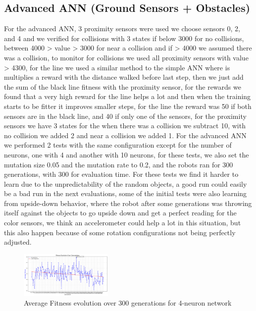\documentclass[final,5p,times,twocolumn,authoryear]{elsarticle}
\begin{document}
\subsection{Advanced ANN (Ground Sensors + Obstacles)}
For the advanced ANN, 3 proximity sensors were used we choose sensors 0, 2, and 4 and we verified for collisions with 3 states if below 3000 for no collisions, between 4000 > value > 3000 for near a collision and if > 4000 we assumed there was a collision, to monitor for collisions we used all proximity sensors with value > 4300, for the line we used a similar method to the simple ANN where is multiplies a reward with the distance walked before last step, then we just add the sum of the black line fitness with the proximity sensor, for the rewards we found that a very high reward for the line helps a lot and then when the training starts to be fitter it improves smaller steps, for the line the reward was 50 if both sensors are in the black line, and 40 if only one of the sensors, for the proximity sensors we have 3 states for the when there was a collision we subtract 10, with no collision we added 2 and near a collision we added 1.
For the advanced ANN we performed 2 tests with the same configuration except for the number of neurons, one with 4 and another with 10 neurons, for these tests, we also set the mutation size 0.05 and the mutation rate to 0.2, and the robots ran for 300 generations, with 300 for evaluation time. For these tests we find it harder to learn due to the unpredictability of the random objects, a good run could easily be a bad run in the next evaluations, some of the initial tests were also learning from upside-down behavior, where the robot after some generations was throwing itself against the objects to go upside down and get a perfect reading for the color sensors, we think an accelerometer could help a lot in this situation, but this also happen because of some rotation configurations not being perfectly adjusted.
\begin{figure}[H]
    \centering
    \includegraphics[width=0.4\textwidth]{figures/fitness_ann_adv_plot_4n.png}
    \caption{Average Fitness evolution over 300 generations for 4-neuron network}
    \label{fig:annadv}
\end{figure}
\end{document}
